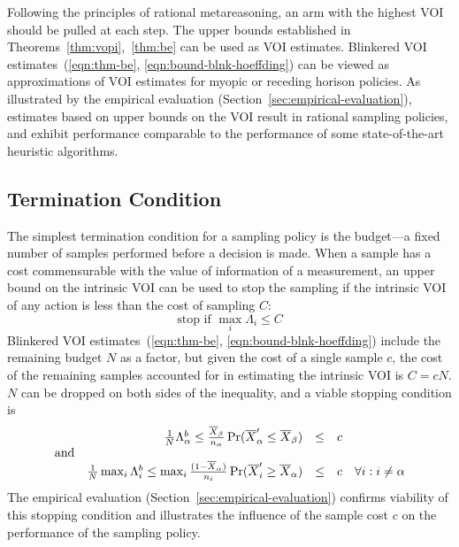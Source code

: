 \documentclass{article}
\begin{document}
Following the principles of rational metareasoning, an arm with
the highest VOI should be pulled at each step. The upper bounds
established in Theorems~\ref{thm:vopi},~\ref{thm:be} can be used
as VOI estimates. Blinkered VOI estimates~(\ref{eqn:thm-be},
 \ref{eqn:bound-blnk-hoeffding}) can be viewed
as approximations of VOI estimates for myopic or
receding horison policies. As illustrated by the empirical evaluation
(Section~\ref{sec:empirical-evaluation}), estimates based on upper
bounds on the VOI result in rational sampling policies, and exhibit
performance comparable to the performance of some state-of-the-art
heuristic algorithms.

\subsection{Termination Condition}
\label{sec:control-termination-condition}

The simplest termination condition for a sampling policy is the
budget---a fixed number of samples performed before a decision is
made. When a sample has a cost commensurable with the value of
information of a measurement, an upper bound on the intrinsic VOI can
be used to stop the sampling if the intrinsic VOI of any action
is less than the cost of sampling $C$:
\begin{equation}
\mbox{stop if } \max_i \Lambda_i \le C
\end{equation}
Blinkered VOI estimates~(\ref{eqn:thm-be},
\ref{eqn:bound-blnk-hoeffding}) include the remaining budget $N$ as a
factor, but given the cost of a single sample $c$, the cost of the
remaining samples accounted for in estimating the intrinsic VOI is
$C=cN$. $N$ can be dropped on both sides of the inequality,
and a viable stopping condition is
\begin{equation}
\begin{array}{c r r l l}
&\frac 1 N \Lambda_\alpha^b
\le\frac {\overline  X_\beta} {n_\alpha}\Pr(\overline X_\alpha'\le\overline X_\beta)&\le& c
&\nonumber\\
\mbox{and}&&&&\nonumber\\
&\frac 1 N \max_i\Lambda_i^b
\le \max_i\frac {(1-\overline  X_\alpha)} {n_i}\Pr(\overline X_i'\ge\overline X_\alpha)&\le& c
 & \forall i: i\ne\alpha
\end{array}
\label{eqn:stopping-blnk}
\end{equation}
The empirical evaluation (Section~\ref{sec:empirical-evaluation})
confirms viability of this stopping condition and illustrates the
influence of the sample cost $c$ on the performance of
the sampling policy.
\end{document}
